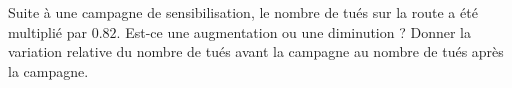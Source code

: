 
\begin{exercice}\label{exosmath-0100}

    Suite à une campagne de sensibilisation, le nombre de tués sur la route a été multiplié par \( 0.82\). Est-ce une augmentation ou une diminution ? Donner la variation relative du nombre de tués avant la campagne au nombre de tués après la campagne.

\end{exercice}
